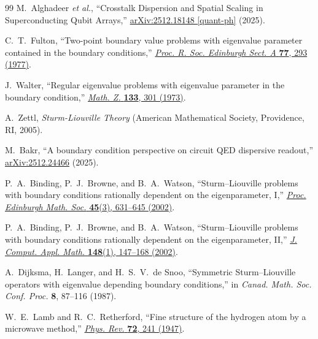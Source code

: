 \documentclass[reprint, floatfix, superscriptaddress, amsmath, amssymb, longbibliography]{revtex4-2}
\begin{document}
\begin{thebibliography}{99}
M.~Alghadeer \textit{et al.},
``Crosstalk Dispersion and Spatial Scaling in Superconducting Qubit Arrays,''
\href{https://arxiv.org/abs/2512.18148}{arXiv:2512.18148 [quant-ph]} (2025).

C.~T.~Fulton, ``Two-point boundary value problems with eigenvalue parameter contained in the boundary conditions,'' 
\href{https://doi.org/10.1098/rspa.1977.0116}{\textit{Proc. R. Soc. Edinburgh Sect. A} \textbf{77}, 293 (1977)}.

J.~Walter, ``Regular eigenvalue problems with eigenvalue parameter in the boundary condition,'' 
\href{https://doi.org/10.1007/BF01432152}{\textit{Math. Z.} \textbf{133}, 301 (1973)}.

A.~Zettl,
\textit{Sturm-Liouville Theory}
(American Mathematical Society, Providence, RI, 2005).

M.~Bakr, ``A boundary condition perspective on circuit QED dispersive readout,'' 
\href{https://arxiv.org/abs/2512.24466}{arXiv:2512.24466} (2025).

P.~A.~Binding, P.~J.~Browne, and B.~A.~Watson,
``Sturm–Liouville problems with boundary conditions rationally dependent on the eigenparameter, I,''
\href{https://doi.org/10.1017/S0013091501000773}{\textit{Proc. Edinburgh Math. Soc.} \textbf{45}(3), 631--645 (2002)}.

P.~A.~Binding, P.~J.~Browne, and B.~A.~Watson,
``Sturm–Liouville problems with boundary conditions rationally dependent on the eigenparameter, II,''
\href{https://doi.org/10.1016/S0377-0427(02)00579-4}{\textit{J. Comput. Appl. Math.} \textbf{148}(1), 147--168 (2002)}.

A.~Dijksma, H.~Langer, and H.~S.~V.~de Snoo,
``Symmetric Sturm–Liouville operators with eigenvalue depending boundary conditions,''
in \textit{Canad. Math. Soc. Conf. Proc.} \textbf{8}, 87--116 (1987).

W.~E.~Lamb and R.~C.~Retherford, ``Fine structure of the hydrogen atom by a microwave method,'' 
\href{https://doi.org/10.1103/PhysRev.72.241}{\textit{Phys. Rev.} \textbf{72}, 241 (1947)}.


\end{thebibliography}
\end{document}
